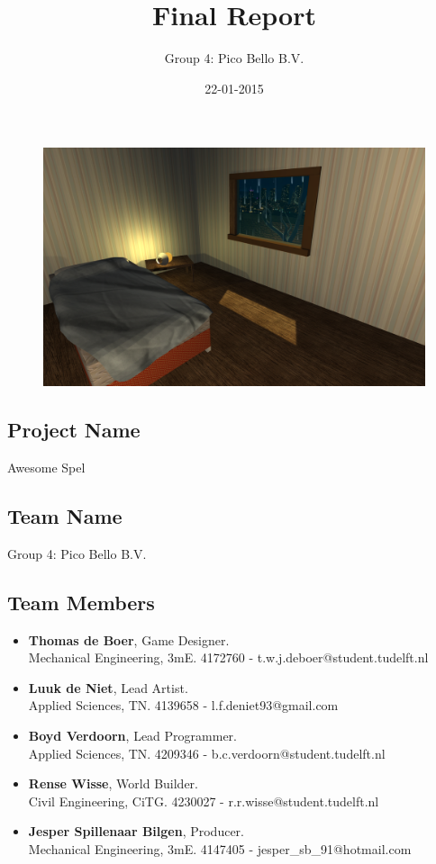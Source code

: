 \documentclass{article}
\title{Final Report}
\author{Group 4: Pico Bello B.V.}
\date{22-01-2015}
\begin{document}
	\selectfont



	\maketitle
	\begin{figure}[ht!]
		\centering
		\includegraphics[width=120mm]{images/Front.png}
	\end{figure}
	\newpage
\subsection*{Project Name}
	\qquad Awesome Spel
\subsection*{Team Name}
	\qquad Group 4: Pico Bello B.V.
\subsection*{Team Members}
	\begin{itemize}
		\item\textbf{Thomas de Boer}, Game Designer.\\Mechanical Engineering, 3mE. 4172760 - t.w.j.deboer@student.tudelft.nl\\
		\item\textbf{Luuk de Niet}, Lead Artist.\\Applied Sciences, TN. 4139658 - l.f.deniet93@gmail.com\\
		\item\textbf{Boyd Verdoorn}, Lead Programmer.\\Applied Sciences, TN. 4209346 - b.c.verdoorn@student.tudelft.nl\\
		\item\textbf{Rense Wisse}, World Builder.\\Civil Engineering, CiTG. 4230027 - r.r.wisse@student.tudelft.nl\\
		\item\textbf{Jesper Spillenaar Bilgen}, Producer.\\Mechanical Engineering, 3mE. 4147405 - jesper\_sb\_91@hotmail.com
	\end{itemize}
\end{document}
